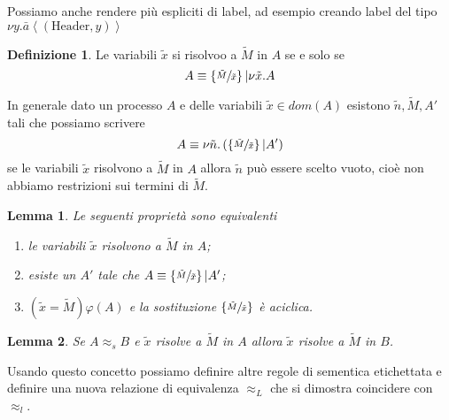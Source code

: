 \documentclass[a4paper,12pt]{article}
\theoremstyle{plain}
\newtheorem{mylem}{Lemma}[section]
\theoremstyle{definition}
\newtheorem{mydef}{Definizione}[section]
\theoremstyle{remark}
\newcommand{\set}[1]{\left\{#1\right\}}
\newcommand{\pa}[1]{\left(#1\right)}
\newcommand{\ang}[1]{\left<#1\right>}
\begin{document}
Possiamo anche rendere pi\`u espliciti di label, ad esempio creando
label del tipo $\nu y.\bar a \ang{ \pa{\text{Header},y}}$

\begin{mydef}
  Le variabili $\tilde x$ si risolvoo a $\tilde M$ in $A$ se e solo se
  \[ A \equiv \set{\sfrac{\tilde M}{\tilde x}} | \nu \tilde x.A \]
\end{mydef}

In generale dato un processo $A$ e delle variabili $\tilde x \in
dom(A)$ esistono $\tilde n, \tilde M, A'$ tali che possiamo scrivere
\[ A \equiv \nu \tilde n. \pa{ \set{\sfrac{\tilde M}{\tilde x}}
    |A'} \]
se le variabili $\tilde x$ risolvono a $\tilde M$ in $A$ allora
$\tilde n$ pu\`o essere scelto vuoto, cio\`e non abbiamo restrizioni
sui termini di $\tilde M$.

\begin{mylem}
  Le seguenti propriet\`a sono equivalenti
  \begin{enumerate}
  \item le variabili $\tilde x$ risolvono a $\tilde M$ in $A$;
  \item esiste un $A'$ tale che $A \equiv \set{\sfrac{\tilde M}{\tilde
        x}} |A'$;
  \item $\pa{\tilde x = \tilde M}\varphi (A)$ e la sostituzione
    $\set{\sfrac{\tilde M}{\tilde x}}$ \`e aciclica.
  \end{enumerate}
\end{mylem}

\begin{mylem}
  Se $A \approx _s B$ e $\tilde x$ risolve a $\tilde M$ in $A$ allora
  $\tilde x$ risolve a $\tilde M$ in $B$.
\end{mylem}

Usando questo concetto possiamo definire altre regole di sementica
etichettata e definire una nuova relazione di equivalenza $\approx _L$
che si dimostra coincidere con $\approx _l$.
\end{document}
